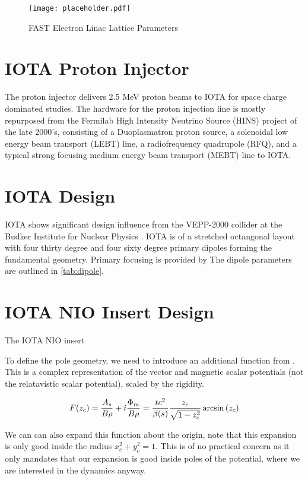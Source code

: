 \begin{figure}
	\centering
	\texttt{[image: placeholder.pdf]}
	\caption{FAST Electron Linac Lattice Parameters}
	\label{fig:linacLat}
\end{figure}

\section{IOTA Proton Injector}

The proton injector delivers 2.5 MeV proton beams to IOTA for space charge dominated studies. The hardware for the proton injection line is mostly repurposed from the Fermilab High Intensity Neutrino Source (HINS) \cite{webberHINS} project of the late 2000's, consisting of a Duoplasmatron proton source, a solenoidal low energy beam transport (LEBT) line, a radiofrequency quadrupole (RFQ), and a typical strong focusing medium energy beam transport (MEBT) line \cite{edstromIPI} to IOTA.

\section{IOTA Design}
IOTA shows significant design influence from the VEPP-2000 collider at the Budker Institute for Nuclear Physics \cite{vepp-2000}. IOTA is of a stretched octangonal layout with four thirty degree and four sixty degree primary dipoles forming the fundamental geometry. Primary focusing is provided by The dipole parameters are outlined in \ref{tab:dipole}. 

\section{IOTA NIO Insert Design}
The IOTA NIO insert

To define the pole geometry, we need to introduce an additional function from \cite{mitchellComplex}. This is a complex representation of the vector and magnetic scalar potentials (not the relatavistic scalar potential), scaled by the rigidity.

\begin{equation} \label{eq:genF}
	F(z_c) = \frac{A_s}{B\rho} + i\frac{\Phi_m}{B\rho} = \frac{t c^2}{\beta(s)}\frac{z_c}{\sqrt{1-z_c^2}} \arcsin{(z_c)} \\ 
\end{equation}

We can can also expand this function about the origin, note that this expansion is only good inside the radius $x_c^2 + y_c^2 = 1$. This is of no practical concern as it only mandates that our expansion is good inside poles of the potential, where we are interested in the dynamics anyway.

